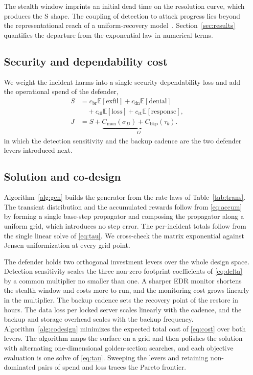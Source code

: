 \documentclass[journal]{IEEEtran}
\newcommand{\E}{\mathbb{E}}
\begin{document}
The stealth window imprints an initial dead time on the resolution curve, which
produces the S shape. The coupling of detection to attack progress lies beyond
the representational reach of a uniform-recovery
model~\cite{liu2021transient}. Section~\ref{sec:results} quantifies the
departure from the exponential law in numerical terms.

\subsection{Security and dependability cost}
We weight the incident harms into a single security-dependability loss and add
the operational spend of the defender,
\begin{align}
S &= c_{\mathrm{br}}\E[\text{exfil}]+c_{\mathrm{dn}}\E[\text{denial}]\nonumber\\
  &\quad +c_{\mathrm{dl}}\E[\text{loss}]+c_{\mathrm{rt}}\E[\text{response}],
\label{eq:sloss}\\
J &= S + \underbrace{C_{\mathrm{mon}}(\sigma_D)+C_{\mathrm{bkp}}(\tau_b)}_{O}.
\label{eq:cost}
\end{align}
in which the detection sensitivity and the backup cadence are the two defender
levers introduced next.

\subsection{Solution and co-design}
Algorithm~\ref{alg:gen} builds the generator from the rate laws of
Table~\ref{tab:trans}. The transient distribution and the
accumulated rewards follow from \eqref{eq:accum} by forming a single base-step
propagator and composing the propagator along a uniform grid, which introduces
no step error. The per-incident totals follow from the single linear solve of
\eqref{eq:tau}. We cross-check the matrix exponential against Jensen
uniformization at every grid point.

The defender holds two orthogonal investment levers over the whole design space.
Detection sensitivity scales the three
non-zero footprint coefficients of \eqref{eq:delta} by a common multiplier no
smaller than one. A sharper EDR monitor shortens the stealth window and costs
more to run, and the monitoring cost grows linearly in the multiplier. The backup
cadence sets the recovery point of the restore in hours. The data loss per locked server scales
linearly with the cadence, and the backup and storage overhead scales with the
backup frequency. Algorithm~\ref{alg:codesign} minimizes the expected total cost
of \eqref{eq:cost} over both levers. The algorithm maps the surface on a grid and then polishes the
solution with alternating one-dimensional golden-section searches, and each
objective evaluation is one solve of \eqref{eq:tau}. Sweeping the levers and
retaining non-dominated pairs of spend and loss traces the Pareto frontier.
\end{document}
